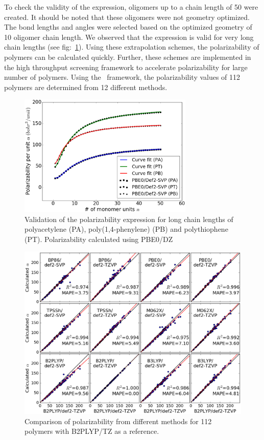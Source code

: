 To check the validity of the expression, oligomers up to a chain length of 50 were created. It should be noted that these oligomers were not geometry optimized. The bond lengths and angles were selected based on the optimized geometry of 10 oligomer chain length. We observed that the expression is valid for very long chain lengths (see fig:\ \ref{fig:Pol_fit_all_long_PBE0_DZ}). Using these extrapolation schemes, the polarizability of polymers can be calculated quickly. Further, these schemes are implemented in the high throughput screening framework to accelerate polarizability for large number of polymers. Using the \chemhtps\ framework, the polarizability values of 112 polymers are determined from 12 different methods.

\begin{figure}[htbp] 
	\centering
	\includegraphics[width=0.744\textwidth]{Chapter-3/Figures/Pol_fit_all_long_PBE0_DZ.eps}
	\caption{Validation of the polarizability expression for long chain lengths of polyacetylene (PA), poly(1,4-phenylene) (PB) and polythiophene (PT). Polarizability calculated using PBE0/DZ} 
	\label{fig:Pol_fit_all_long_PBE0_DZ} 
\end{figure}  

\begin{figure}[htbp] 
	\centering
	\includegraphics[width=1.00\textwidth]{Chapter-3/Figures/Pol_all_methods.eps}
	\caption{Comparison of polarizability from different methods for 112 polymers with B2PLYP/TZ as a reference.} 
	\label{fig:Pol_all_methods} 
\end{figure}  


